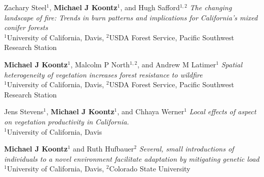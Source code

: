 \documentclass[11pt,english]{article}
\providecommand{\tabularnewline}{\\}
\begin{document}
\begin{hangparas}{0.4in}{1}

\hspace{0.575em}Zachary Steel$^{1}$, \textbf{Michael J Koontz}$^{1}$, and Hugh Safford$^{1, 2}$
\emph{The changing landscape of fire: Trends in burn patterns and implications for California's mixed conifer forests} \tabularnewline
$^{1}$University of California, Davis, $^{2}$USDA Forest Service, Pacific Southwest Research Station

\hspace{0.575em}\textbf{Michael J Koontz}$^{1}$, Malcolm P North$^{1,2}$, and Andrew M Latimer$^{1}$
\emph{Spatial heterogeneity of vegetation increases forest resistance to wildfire} \tabularnewline
$^{1}$University of California, Davis, $^{2}$USDA Forest Service, Pacific Southwest Research Station

\hspace{0.575em}Jens Stevens$^{1}$, \textbf{Michael J Koontz}$^{1}$, and Chhaya Werner$^{1}$
\emph{Local effects of aspect on vegetation productivity in California.}\tabularnewline
$^{1}$University of California, Davis

\hspace{0.575em}\textbf{Michael J Koontz}$^{1}$ and Ruth Hufbauer$^{2}$
\emph{Several, small introductions of individuals to a novel environment facilitate adaptation by mitigating genetic load} \tabularnewline
$^{1}$University of California, Davis, $^{2}$Colorado State University 

%

\end{hangparas}
\vspace{1ex}


\vspace{1.5ex}
\end{document}
